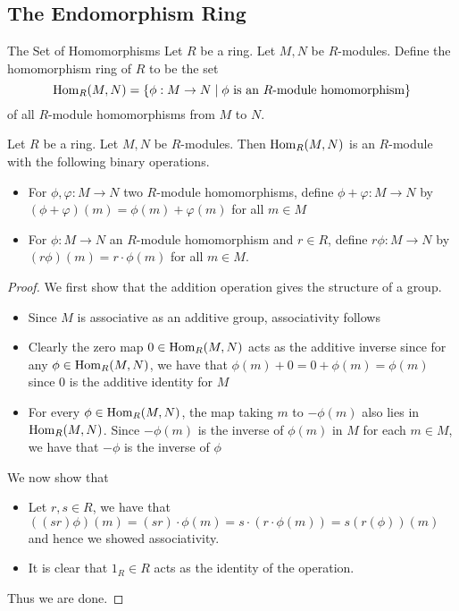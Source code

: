 \documentclass[a4paper]{article}
\begin{document}
\subsection{The Endomorphism Ring}
\begin{defn}{The Set of Homomorphisms}{} Let $R$ be a ring. Let $M,N$ be $R$-modules. Define the homomorphism ring of $R$ to be the set $$\operatorname{Hom}_R(M,N)=\{\phi:M\to N\;|\;\phi\text{ is an }R\text{-module homomorphism}\}$$ of all $R$-module homomorphisms from $M$ to $N$.
\end{defn}

\begin{prp}{}{} Let $R$ be a ring. Let $M,N$ be $R$-modules. Then $\operatorname{Hom}_R(M,N)$ is an $R$-module with the following binary operations. 
\begin{itemize}
\item For $\phi,\varphi:M\to N$ two $R$-module homomorphisms, define $\phi+\varphi:M\to N$ by $(\phi+\varphi)(m)=\phi(m)+\varphi(m)$ for all $m\in M$
\item For $\phi:M\to N$ an $R$-module homomorphism and $r\in R$, define $r\phi:M\to N$ by $(r\phi)(m)=r\cdot\phi(m)$ for all $m\in M$. 
\end{itemize} \tcbline
\begin{proof}
We first show that the addition operation gives the structure of a group. 
\begin{itemize}
\item Since $M$ is associative as an additive group, associativity follows
\item Clearly the zero map $0\in\operatorname{Hom}_R(M,N)$ acts as the additive inverse since for any $\phi\in\operatorname{Hom}_R(M,N)$, we have that $\phi(m)+0=0+\phi(m)=\phi(m)$ since $0$ is the additive identity for $M$
\item For every $\phi\in\operatorname{Hom}_R(M,N)$, the map taking $m$ to $-\phi(m)$ also lies in $\operatorname{Hom}_R(M,N)$. Since $-\phi(m)$ is the inverse of $\phi(m)$ in $M$ for each $m\in M$, we have that $-\phi$ is the inverse of $\phi$
\end{itemize}
We now show that 
\begin{itemize}
\item Let $r,s\in R$, we have that $((sr)\phi)(m)=(sr)\cdot\phi(m)=s\cdot(r\cdot\phi(m))=s(r(\phi))(m)$ and hence we showed associativity. 
\item It is clear that $1_R\in R$ acts as the identity of the operation. 
\end{itemize}
Thus we are done. 
\end{proof}
\end{prp}
\end{document}
